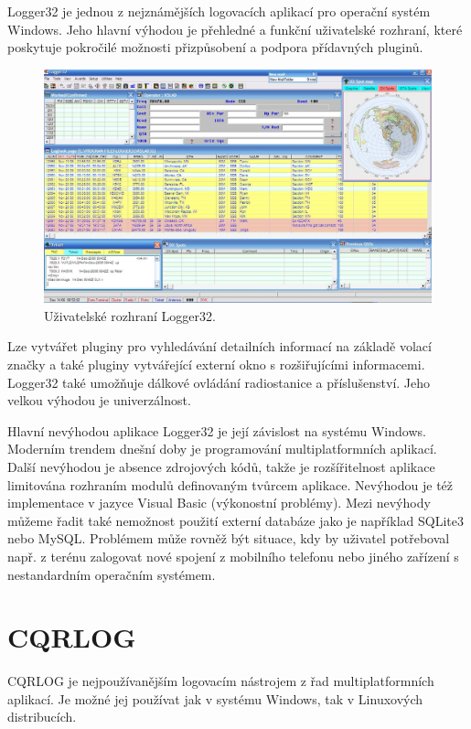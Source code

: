 Logger32 je jednou z nejznámějších logovacích aplikací pro operační systém Windows. Jeho hlavní výhodou je přehledné a funkční
uživatelské rozhraní, které poskytuje pokročilé možnosti přizpůsobení a podpora přídavných pluginů.

\begin{figure}[h]
\centering
\includegraphics[trim=0cm 0cm 0cm 0cm, scale=0.33]{fig/logger32}
\caption{Uživatelské rozhraní Logger32.}
\label{fig:FigureExample}
\end{figure}

Lze vytvářet pluginy pro vyhledávání detailních informací na základě volací značky a také pluginy vytvářející externí okno
s rozšiřujícími informacemi. Logger32 také umožňuje dálkové ovládání
radiostanice a příslušenství. Jeho velkou výhodou je univerzálnost.

Hlavní nevýhodou aplikace Logger32 je její závislost na systému Windows. Moderním trendem dnešní doby je programování multiplatformních
aplikací. Další nevýhodou je absence zdrojových kódů, takže je rozšířitelnost aplikace limitována rozhraním modulů definovaným
tvůrcem aplikace. Nevýhodou je též implementace v jazyce Visual Basic
(výkonostní problémy).
Mezi nevýhody můžeme řadit také nemožnost použití externí databáze jako je například SQLite3 nebo MySQL. Problémem může rovněž být
situace, kdy by uživatel potřeboval např. z terénu 
zalogovat %
nové spojení z mobilního telefonu nebo jiného zařízení s nestandardním operačním systémem.

\section{CQRLOG}

CQRLOG je nejpoužívanějším logovacím nástrojem z řad multiplatformních aplikací. Je možné jej používat jak v systému
Windows, tak v Linuxových distribucích.

